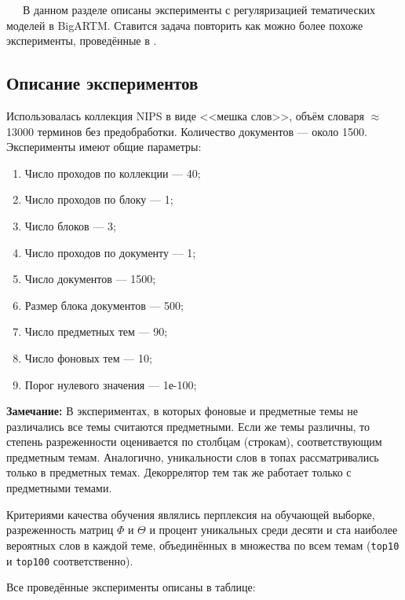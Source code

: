 $\quad\;\:$В данном разделе описаны эксперименты с регуляризацией тематических моделей в BigARTM. Ставится задача повторить как можно более похоже эксперименты, проведённые в \cite{voron_potap_14}.

\subsection{Описание экспериментов}

Использовалась коллекция NIPS в виде <<мешка слов>>, объём словаря $\approx$ 13000 терминов без предобработки. Количество документов --- около 1500. Эксперименты имеют общие параметры:

\vspace{5pt}

\begin{enumerate}
 \item Число проходов по коллекции --- 40;
 \item Число проходов по блоку --- 1;
 \item Число блоков --- 3;
 \item Число проходов по документу --- 1;
 \item Число документов --- 1500;
 \item Размер блока документов --- 500;
 \item Число предметных тем --- 90;
 \item Число фоновых тем --- 10;
 \item Порог нулевого значения --- 1е-100;
\end{enumerate}

{\bf Замечание: }В экспериментах, в которых фоновые и предметные темы не различались все темы считаются предметными. Если же темы различны, то степень разреженности оценивается по столбцам (строкам), соответствующим предметным темам. Аналогично, уникальности слов в топах рассматривались только в предметных темах. Декоррелятор тем так же работает только с предметными темами.

\vspace{5pt}

Критериями качества обучения являлись перплексия на обучающей выборке, разреженность матриц $\Phi$ и $\Theta$ и процент уникальных среди десяти и ста наиболее вероятных слов в каждой теме, объединённых в множества по всем темам (\verb|top10| и \verb|top100| соответственно). 

Все проведённые эксперименты описаны в таблице:

